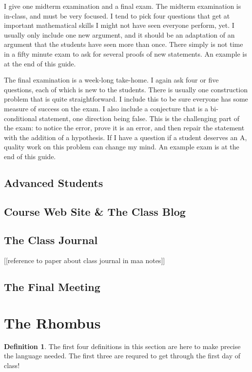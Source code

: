 \documentclass{tufte-handout}
\theoremstyle{definition}
\newtheorem*{definition}{Definition}
\begin{document}
I give one midterm examination and a final exam.
The midterm examination is in-class, and must be very focused.
I tend to pick four questions that get at important mathematical skills I might not have seen everyone perform, yet.
I usually only include one new argument, and it should be an adaptation of an argument that the students have seen more than once.
There simply is not time in a fifty minute exam to ask for several proofs of new statements.
An example is at the end of this guide.

The final examination is a week-long take-home.
I again ask four or five questions, each of which is new to the students.
There is usually one construction problem that is quite straightforward.
I include this to be sure everyone has some measure of success on the exam.
I also include a conjecture that is a bi-conditional statement, one direction being false.
This is the challenging part of the exam: to notice the error, prove it is an error, and then repair the statement with the addition of a hypothesis.
If I have a question if a student deserves an A, quality work on this problem can change my mind.
An example exam is at the end of this guide.

\subsection{Advanced Students}

\subsection{Course Web Site \& The Class Blog}


\subsection{The Class Journal}

[[reference to paper about class journal in maa notes]]


\subsection{The Final Meeting}

\clearpage
\setcounter{section}{1}
\section{The Rhombus}

\begin{definition}
The first four definitions in this section are here to make precise the language needed. The first three are requred to get through the first day of class! 
\end{definition}
\end{document}
